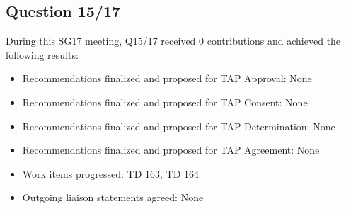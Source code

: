 \subsection{Question 15/17}

During this SG17 meeting, Q15/17 received 0 contributions and achieved the following results:

\begin{itemize}
  \item Recommendations finalized and proposed for TAP Approval: None
  \item Recommendations finalized and proposed for TAP Consent: None
  \item Recommendations finalized and proposed for TAP Determination: None
  \item Recommendations finalized and proposed for TAP Agreement: None
  \item Work items progressed: \href{https://www.itu.int/md/meetingdoc.asp?lang=en\&parent=T25-SG17-260402-TD-WP1-0163}{TD 163}, \href{https://www.itu.int/md/meetingdoc.asp?lang=en\&parent=T25-SG17-260402-TD-WP1-0164}{TD 164}
  \item Outgoing liaison statements agreed: None
\end{itemize}
